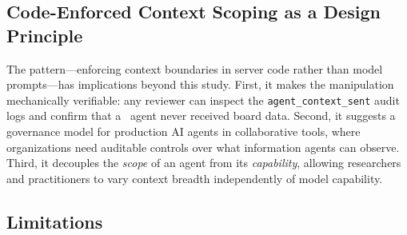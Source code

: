 \subsection{Code-Enforced Context Scoping as a Design Principle}
\label{sec:discussion:gate}

The \ContextGate pattern---enforcing context boundaries in server code rather
than model prompts---has implications beyond this study. First, it makes the
manipulation mechanically verifiable: any reviewer can inspect the
\texttt{agent\_context\_sent} audit logs and confirm that a \CI\ agent never
received board data. Second, it suggests a governance model for production AI
agents in collaborative tools, where organizations need auditable controls over
what information agents can observe. Third, it decouples the \emph{scope} of an
agent from its \emph{capability}, allowing researchers and practitioners to vary
context breadth independently of model capability.

\subsection{Limitations}
\label{sec:discussion:limitations}

